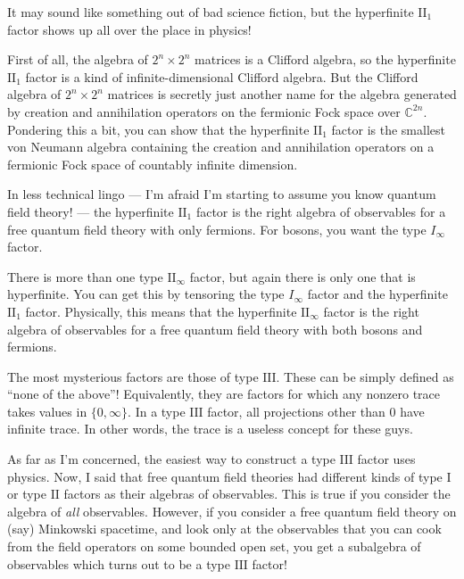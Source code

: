 \documentclass{article}
\begin{document}
It may sound like something out of bad science fiction, but the
hyperfinite \(\mathrm{II}_1\) factor shows up all over the place in
physics!

First of all, the algebra of \(2^n\times2^n\) matrices is a Clifford
algebra, so the hyperfinite \(\mathrm{II}_1\) factor is a kind of
infinite-dimensional Clifford algebra. But the Clifford algebra of
\(2^n\times2^n\) matrices is secretly just another name for the algebra
generated by creation and annihilation operators on the fermionic Fock
space over \(\mathbb{C}^{2n}\). Pondering this a bit, you can show that
the hyperfinite \(\mathrm{II}_1\) factor is the smallest von Neumann
algebra containing the creation and annihilation operators on a
fermionic Fock space of countably infinite dimension.

In less technical lingo --- I'm afraid I'm starting to assume you know
quantum field theory! --- the hyperfinite \(\mathrm{II}_1\) factor is
the right algebra of observables for a free quantum field theory with
only fermions. For bosons, you want the type \(I_\infty\) factor.

There is more than one type \(\mathrm{II}_\infty\) factor, but again
there is only one that is hyperfinite. You can get this by tensoring the
type \(I_\infty\) factor and the hyperfinite \(\mathrm{II}_1\) factor.
Physically, this means that the hyperfinite \(\mathrm{II}_\infty\)
factor is the right algebra of observables for a free quantum field
theory with both bosons and fermions.

The most mysterious factors are those of type \(\mathrm{III}\). These
can be simply defined as ``none of the above''! Equivalently, they are
factors for which any nonzero trace takes values in \(\{0,\infty\}\). In
a type \(\mathrm{III}\) factor, all projections other than \(0\) have
infinite trace. In other words, the trace is a useless concept for these
guys.

As far as I'm concerned, the easiest way to construct a type
\(\mathrm{III}\) factor uses physics. Now, I said that free quantum
field theories had different kinds of type \(\mathrm{I}\) or type
\(\mathrm{II}\) factors as their algebras of observables. This is true
if you consider the algebra of \emph{all} observables. However, if you
consider a free quantum field theory on (say) Minkowski spacetime, and
look only at the observables that you can cook from the field operators
on some bounded open set, you get a subalgebra of observables which
turns out to be a type \(\mathrm{III}\) factor!
\end{document}
